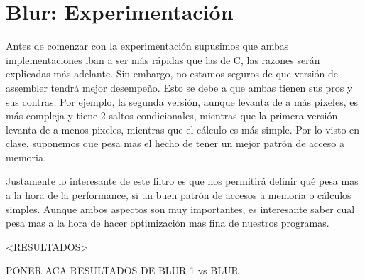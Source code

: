 \section*{Blur: Experimentación}

Antes de comenzar con la experimentación supusimos que ambas implementaciones iban a ser más rápidas que las de C, las razones serán explicadas más adelante. Sin embargo, no estamos seguros de que versión de assembler tendrá mejor desempeño.
Esto se debe a que ambas tienen sus pros y sus contras. Por ejemplo, la segunda versión, aunque levanta de a más píxeles, es más compleja y tiene 2 saltos condicionales, mientras que la primera versión levanta de a menos pixeles, mientras que el cálculo es más simple. Por lo visto en clase, suponemos que pesa mas el hecho de tener un mejor patrón de acceso a memoria.

Justamente lo interesante de este filtro es que nos permitirá definir qué pesa mas a la hora de la performance, si un buen patrón de accesos a memoria o cálculos simples. Aunque ambos aspectos son muy importantes, es interesante saber cual pesa mas a la hora de hacer optimización mas fina de nuestros programas.


<RESULTADOS>


PONER ACA RESULTADOS DE BLUR 1 vs BLUR 










